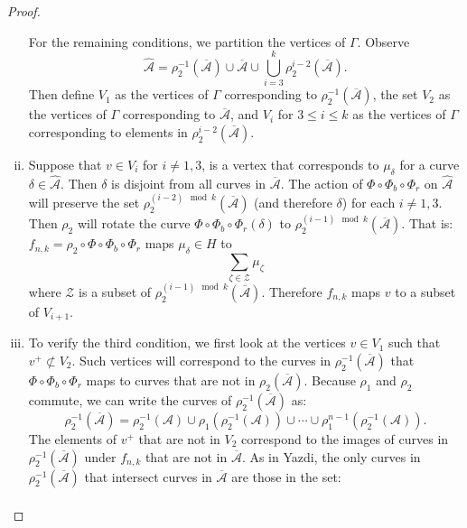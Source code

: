 \begin{proof}
\begin{enumerate}[(i)]
\medskip
For the remaining conditions, we partition the vertices of $\Gamma$.  Observe
$$\widehat{\mathcal{A}} = \rho_{2}^{-1}(\overline{\mathcal{A}})\cup\overline{\mathcal{A}}\cup\bigcup_{i=3}^k \rho_2^{i-2}(\overline{\mathcal{A}}).$$ Then define $V_1$ as the vertices of $\Gamma$ corresponding to $\rho_2^{-1}(\overline{\mathcal{A}})$, the set $V_2$ as the vertices of $\Gamma$ corresponding to $\overline{\mathcal{A}}$, and $V_i$ for
$3 \leq i \leq k$ as the vertices of $\Gamma$ corresponding to elements in
$\rho_2^{i-2}(\overline{\mathcal{A}})$. 
\item Suppose that $v \in V_i$ for $i \neq 1,3$, is a vertex
  that corresponds to $\mu_\delta$ for a curve $\delta \in \widehat{\mathcal{A}}$.  %
  Then $\delta$ is disjoint from all curves in $\overline{\mathcal{A}}$.  The action of $\Phi\circ\Phi_b\circ\Phi_r$ on $\widehat{\mathcal{A}}$ will preserve the set $\rho_2^{(i-2)\mod k}(\overline{\mathcal{A}})$ (and therefore $\delta$) for each $i\neq 1,3$.  %
  Then $\rho_2$ will rotate the curve $\Phi\circ \Phi_b\circ\Phi_r(\delta)$ to $\rho_2^{(i-1)\mod k}(\overline{\mathcal{A}})$. That is: $f_{n,k}=\rho_2\circ\Phi\circ\Phi_b\circ\Phi_r$ maps $\mu_\delta\in H$ to $$\sum_{\zeta\in \mathcal{Z}}\mu_\zeta$$ where $\mathcal{Z}$ is a subset of $\rho_2^{(i-1)\mod k}(\overline{\mathcal{A}})$.  Therefore $f_{n,k}$ maps $v$ to a subset of $V_{i+1}$.
\item To verify the third condition, we first look at the vertices $v \in V_1$ such that $v^+ \not\subset V_2$. Such vertices will correspond to the curves in $\rho_2^{-1}(\overline{\mathcal{A}})$ that $\Phi\circ\Phi_b\circ\Phi_r$ maps to curves that are not in $\rho_2(\overline{\mathcal{A}})$.  Because $\rho_1$ and $\rho_2$ commute, we can write the curves of $\rho_2^{-1}(\overline{\mathcal{A}})$ as: 
    $$\rho_2^{-1}(\overline{\mathcal{A}})=\rho_2^{-1}(\mathcal{A})\cup\rho_1(\rho_2^{-1}(\mathcal{A}))\cup\cdots\cup\rho_1^{n-1}(\rho_2^{-1}(\mathcal{A})).$$  The elements of $v^+$ that are not in $V_2$ correspond to the images of curves in $\rho_2^{-1}(\overline{\mathcal{A}})$ under $f_{n,k}$ that are not in $\overline{\mathcal{A}}$.  
As in Yazdi, the only curves in $\rho_2^{-1}(\overline{\mathcal{A}})$ that intersect curves in $\overline{\mathcal{A}}$ are those in the set: 
\begin{align*}

\end{align*}
\end{enumerate}
\end{proof}
